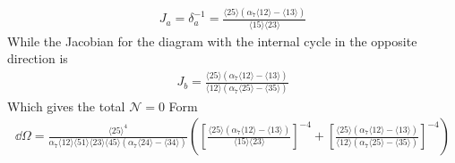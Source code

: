 \documentclass[letter,11pt]{article}
\newcommand{\ab}[1]{\langle #1 \rangle}
\begin{document}
\begin{equation}
	\begin{aligned}
		J_a=\delta_a^{-1}=
		\frac{\ab{25}\left(\alpha_7\ab{12}-\ab{13}\right)}{\ab{15}\ab{23}}
	\end{aligned}
\end{equation}
While the Jacobian for the diagram with the internal cycle in the opposite direction is
\begin{equation}
	\begin{aligned}
		J_b=
		\frac{\ab{25}\left(\alpha_7\ab{12}-\ab{13}\right)}{\ab{12}\left(\alpha_7\ab{25}-\ab{35}\right)}
	\end{aligned}
\end{equation}
Which gives the total $\mathcal{N}=0$ Form
\begin{equation}
	\begin{aligned}
		 \dd\Omega =\frac{\ab{25}^4}{\alpha_7 \ab{12}\ab{51}\ab{23}\ab{45}\left(\alpha_7\ab{24}-\ab{34}\right)}\left(	\left[\frac{\ab{25}\left(\alpha_7\ab{12}-\ab{13}\right)}{\ab{15}\ab{23}}\right]^{-4}+
		\left[\frac{\ab{25}\left(\alpha_7\ab{12}-\ab{13}\right)}{\ab{12}\left(\alpha_7\ab{25}-\ab{35}\right)}\right]^{-4}\right)
	\end{aligned}
\end{equation}
\end{document}
